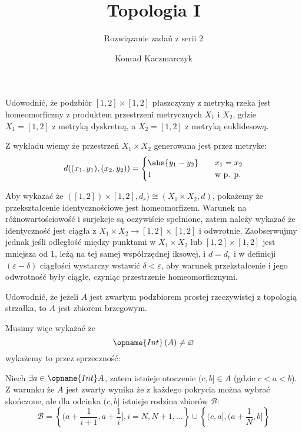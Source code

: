 \documentclass[11pt]{scrartcl}
\author{Konrad Kaczmarczyk}
\begin{document}
  \title{Topologia I}
  \subtitle{Rozwiązanie zadań z serii 2}
  \maketitle
   \begin{zadanie*}
     Udowodnić, że podzbiór $[1, 2] \times [1, 2]$ płaszczyzny z metryką rzeka jest homeomorficzny z produktem przestrzeni metrycznych $X_1$ i $X_2$, gdzie $X_1 = [1, 2]$ z metryką dyskretną, a $X_2 = [1, 2]$ z metryką euklidesową.
   \end{zadanie*}

   Z wykładu wiemy że przestrzeń $X_1 \times X_2$ generowana jest przez metryke:
   \[
       d((x_1, y_1), (x_2, y_2)) = 
       \begin{cases}
         \abs{y_1 - y_2}  \quad & x_1 = x_2 \\
         1 \quad & \text{w p. p.}
       \end{cases}
   \]

   Aby wykazać że $( \left [ 1, 2 \right ]) \times [1,2], d_r ) \cong (X_1 \times X_2, d)$, pokażemy że przekształcenie identycznościowe jest homeomorfizem.
   Warunek na różnowartościowość i surjekcje są oczywiście spełnione, zatem należy wykazać że identyczność jest ciągła z $X_1 \times X_2 \to [1,2] \times [1,2]$ i odwrotnie.
   Zaobserwujmy jednak jeśli odległość między punktami w $X_1 \times X_2$ lub $[1,2] \times [1,2]$ jest mniejsza od 1, leżą na tej samej współrzędnej iksowej, i $d = d_r$ i w definicji $(\varepsilon - \delta)$ ciągłości wystarczy wstawić $\delta < \varepsilon$, aby warunek przekstałcenie i jego odwrotność były ciągłe, czyniąc przestrzenie homeomorficznymi.

   \begin{zadanie*}
       Udowodnić, że jeżeli $A$ jest zwartym podzbiorem prostej rzeczywistej z topologią strzałka, to $A$ jest zbiorem brzegowym.
   \end{zadanie*}

   Musimy więc wykażać że
   \[
     \opname{Int} \left ( A \right ) \not = \varnothing
   \]
   wykażemy to przez sprzeczność:

   Niech $\exists a \in \opname{Int} A$, zatem istnieje otoczenie $( c, b ] \in A$ (gdzie $c < a < b$).
   Z warunku że $A$ jest zwarty wynika że z każdego pokrycia można wybrać skończone, ale dla odcinka $( c, b]$ istnieje rodzina zbiorów $\mathcal{B}$:
   \[
     \mathcal{B} = \left \{ ( a + \frac{1}{i + 1} , a + \frac{1}{i} ] , i = N, N + 1, \dots \right \} \cup \left \{ (c, a] , (a + \frac{1}{N}, b] \right \}
   \]
\end{document}
